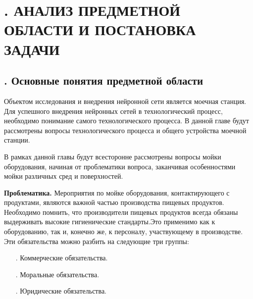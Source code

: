 \setcounter{chaptercntr}{1}

\sectionbreak \section*{
  \gostTitleFont
  \redline
  \thechaptercntr .
  АНАЛИЗ ПРЕДМЕТНОЙ ОБЛАСТИ И ПОСТАНОВКА ЗАДАЧИ
}

\titlespace

\subsection*{ 
  \gostTitleFont
  \redline
  \thechaptercntr .\thesubchaptercntr \spc 
  Основные понятия предметной области
} \addtocounter{subchaptercntr}{1}

\subtitlespace

{\gostFont

\par \redline Объектом исследования и внедрения нейронной сети является моечная станция. Для успешного внедрения нейронных сетей в технологический процесс, необходимо понимание самого технологического процесса. В данной главе будут рассмотрены вопросы технологического процесса и общего устройства моечной станции. 

\par \redline В рамках данной главы будут всесторонне рассмотрены вопросы мойки оборудования, начиная от проблематики вопроса, заканчивая особенностями мойки различных сред и поверхностей.


\par \redline  \textbf{Проблематика.} Мероприятия по мойке оборудования, контактирующего с продуктами, являются важной частью производства пищевых продуктов. Необходимо помнить, что производители пищевых продуктов всегда обязаны выдерживать высокие гигиенические стандарты.Это применимо как к оборудованию, так и, конечно же, к персоналу, участвующему	в производстве. Эти обязательства можно разбить на следующие три группы:

\begin{itemize}[leftmargin=2.15cm, labelwidth=0.65cm, labelsep=0.0cm] 
	
	\item[\theitemcntr. ] Коммерческие обязательства.
	\addtocounter{itemcntr}{1}
	
	\item[\theitemcntr. ] Моральные обязательства.
	\addtocounter{itemcntr}{1}
	
	\item[\theitemcntr. ] Юридические обязательства.
	\addtocounter{itemcntr}{1}
	

\end{itemize}}
